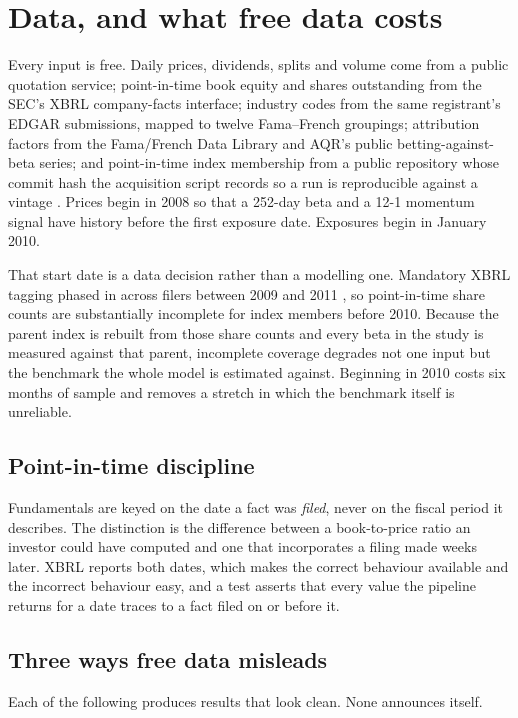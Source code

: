 \section{Data, and what free data costs}
\label{sec:data}
Every input is free. Daily prices, dividends, splits and volume come from a
public quotation service; point-in-time book equity and shares outstanding from
the SEC's XBRL company-facts interface; industry codes from the same
registrant's EDGAR submissions, mapped to twelve Fama--French groupings;
attribution factors from the Fama/French Data Library and AQR's public
betting-against-beta series; and point-in-time index membership from a public
repository whose commit hash the acquisition script records so a run is
reproducible against a vintage \citep{secedgarapi,frenchdatalibrary,aqrbab}.
Prices begin in 2008 so that a 252-day beta and a 12-1 momentum signal have
history before the first exposure date. Exposures begin in January 2010.

That start date is a data decision rather than a modelling one. Mandatory XBRL
tagging phased in across filers between 2009 and 2011 \citep{secedgarapi}, so
point-in-time share counts are substantially incomplete for index members
before 2010. Because the parent index is rebuilt from those share counts and
every beta in the study is measured against that parent, incomplete coverage
degrades not one input but the benchmark the whole model is estimated against.
Beginning in 2010 costs six months of sample and removes a stretch in which the
benchmark itself is unreliable.

\subsection{Point-in-time discipline}
Fundamentals are keyed on the date a fact was \emph{filed}, never on the fiscal
period it describes. The distinction is the difference between a book-to-price
ratio an investor could have computed and one that incorporates a filing made
weeks later. XBRL reports both dates, which makes the correct behaviour
available and the incorrect behaviour easy, and a test asserts that every value
the pipeline returns for a date traces to a fact filed on or before it.

\subsection{Three ways free data misleads}
Each of the following produces results that look clean. None announces itself.

